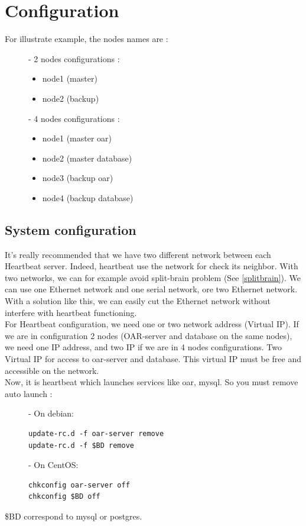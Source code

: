 \documentclass[a4paper,10pt]{report}
\begin{document}
\chapter{Configuration}

For illustrate example, the nodes names are :
\begin{description}
\item[]- 2 nodes configurations : 
\begin{itemize}
\item node1 (master)
\item node2 (backup)
\end{itemize}

\item[]- 4 nodes configurations :
\begin{itemize}
\item node1 (master oar)
\item node2 (master database)
\item node3 (backup oar)
\item node4 (backup database)
\end{itemize}
\end{description}


\section{System configuration}
\label{sysconf}
It's really recommended that we have two different network between each Heartbeat server. Indeed, heartbeat use the network for check its neighbor. With two networks, we can for example avoid split-brain problem (See \ref{splitbrain}). We can use one Ethernet network and one serial network, ore two Ethernet network. With a solution like this, we can easily cut the Ethernet network without interfere with heartbeat functioning.\\

For Heartbeat configuration, we need one or two network address (Virtual IP). If we are in configuration 2 nodes (OAR-server and database on the same nodes), we need one IP address, and two IP if we are in 4 nodes configurations. Two Virtual IP for access to oar-server and database. This virtual IP must be free and accessible on the network.\\

Now, it is heartbeat which launches services like oar, mysql. So you must remove auto launch :
\begin{description}
\item[]- On debian:
\begin{lstlisting}
update-rc.d -f oar-server remove
update-rc.d -f $BD remove
\end{lstlisting}
\item[]- On CentOS:
\begin{lstlisting}
chkconfig oar-server off
chkconfig $BD off
\end{lstlisting}
\end{description}
\$BD correspond to mysql or postgres.\\
\end{document}
